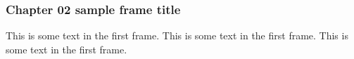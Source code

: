\begin{frame}
    \frametitle{Chapter 02 sample frame title}
    This is some text in the first frame. This is some text in the first frame. This is some text in the first frame.
\end{frame}
